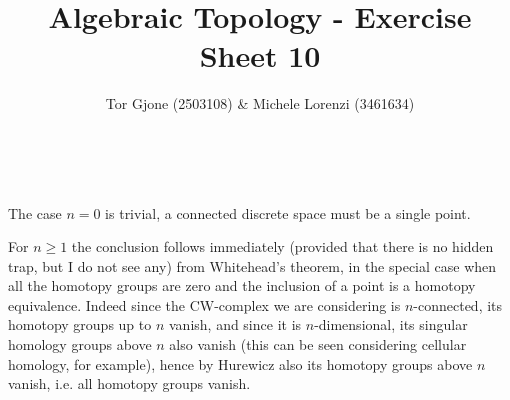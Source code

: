 \documentclass[a4paper,11pt,english]{article}
\title{\textbf{Algebraic Topology} - Exercise Sheet 10}
\author{Tor Gjone (2503108) \& Michele Lorenzi (3461634)}
\begin{document}
\mmaketitle

\begin{exercise}[1]\ 

The case $n=0$ is trivial, a connected discrete space must be a single point.

For $n\ge1$ the conclusion follows immediately (provided that there is no hidden trap, but I do not see any) from Whitehead's theorem, in the special case when all the homotopy groups are zero and the inclusion of a point is a homotopy equivalence. Indeed since the CW-complex we are considering is $n$-connected, its homotopy groups up to $n$ vanish, and since it is $n$-dimensional, its singular homology groups above $n$ also vanish (this can be seen considering cellular homology, for example), hence by Hurewicz also its homotopy groups above $n$ vanish, i.e. all homotopy groups vanish.

\end{exercise}
\end{document}
